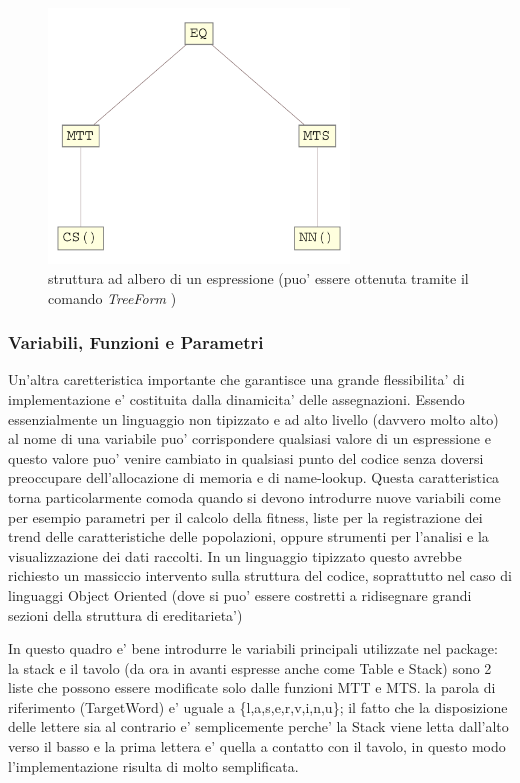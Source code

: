 \documentclass[12pt, a4paper]{article}
\begin{document}
\begin{figure}[h]
\begin{center}
\includegraphics[width=8.0cm]{esempio_albero.pdf}
\caption{struttura ad albero di un espressione (puo' essere ottenuta tramite il comando 
{\itshape TreeForm} )}
\label{figure:estree}
\end{center}
\end{figure}


\subsubsection{Variabili, Funzioni e Parametri}
Un'altra caretteristica importante che garantisce una grande flessibilita' di implementazione e' costituita dalla dinamicita' delle assegnazioni. Essendo essenzialmente un linguaggio non tipizzato e ad alto livello (davvero molto alto) al nome di una variabile puo' corrispondere qualsiasi valore di un espressione e questo valore puo' venire cambiato in qualsiasi punto del codice senza doversi preoccupare dell'allocazione di memoria e di name-lookup. Questa caratteristica torna particolarmente comoda quando si devono introdurre nuove variabili come per esempio parametri per il calcolo della fitness, liste per la registrazione dei trend delle caratteristiche delle popolazioni, oppure strumenti per l'analisi e la visualizzazione dei dati raccolti. In un linguaggio tipizzato questo avrebbe richiesto un massiccio intervento sulla struttura del codice, soprattutto nel caso di linguaggi Object Oriented (dove si puo' essere costretti a ridisegnare grandi sezioni della struttura di ereditarieta')

In questo quadro e' bene introdurre le variabili principali utilizzate nel package:
la stack e il tavolo (da ora in avanti espresse anche come Table e Stack) sono 2 liste che possono essere modificate solo dalle funzioni MTT e MTS.
la parola di riferimento (TargetWord) e' uguale a \{l,a,s,e,r,v,i,n,u\}; il fatto che la disposizione delle lettere sia al contrario e' semplicemente perche' la Stack viene letta dall'alto verso il basso e la prima lettera e' quella a contatto con il tavolo, in questo modo l'implementazione risulta di molto semplificata.
\end{document}
